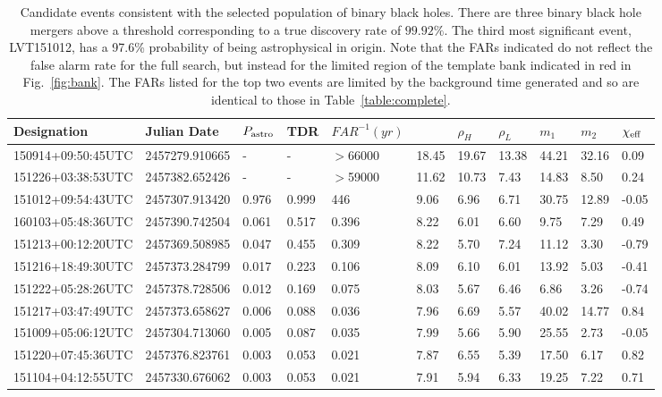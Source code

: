 \begin{table}[ht!]
  \begin{center}
    \caption{Candidate events consistent with the selected population of binary black holes. There are three binary black hole mergers above a threshold corresponding to a true discovery rate of $99.92\%$. The third most significant event, LVT151012, has a 97.6\% probability of
    being astrophysical in origin. Note that the FARs indicated do not reflect the false alarm rate for the full search, but instead for the limited region of the template bank indicated in red in Fig.~\ref{fig:bank}. The FARs listed for the top two events are limited
    by the background time generated and so are identical to those in Table~\ref{table:complete}.}
    \label{table:bbh}
  \end{center}
\begin{tabularx}{1.0\textwidth}{lllllllllll}
Designation & Julian Date & $P_{\mathrm{astro}}{}$ & TDR & $FAR^{-1} (yr)$ & \rankingstat{} & $\rho_H$ & $\rho_L$ & $m_1$ & $m_2$ & $\chi_{\mathrm{eff}}{}$ \\ \hline
150914+09:50:45UTC & 2457279.910665 & - & - &  $>$66000 & 18.45 & 19.67 & 13.38 & 44.21 & 32.16 & 0.09\\
151226+03:38:53UTC & 2457382.652426 & - & - &  $>$59000 & 11.62 & 10.73 & 7.43 & 14.83 & 8.50 & 0.24\\
151012+09:54:43UTC & 2457307.913420 & 0.976 & 0.999 &    446 & 9.06 & 6.96 & 6.71 & 30.75 & 12.89 & -0.05\\
160103+05:48:36UTC & 2457390.742504 & 0.061 & 0.517 &      0.396 & 8.22 & 6.01 & 6.60 & 9.75 & 7.29 & 0.49\\
151213+00:12:20UTC & 2457369.508985 & 0.047 & 0.455 &      0.309 & 8.22 & 5.70 & 7.24 & 11.12 & 3.30 & -0.79\\
151216+18:49:30UTC & 2457373.284799 & 0.017 & 0.223 &      0.106 & 8.09 & 6.10 & 6.01 & 13.92 & 5.03 & -0.41\\
151222+05:28:26UTC & 2457378.728506 & 0.012 & 0.169 &      0.075 & 8.03 & 5.67 & 6.46 & 6.86 & 3.26 & -0.74\\
151217+03:47:49UTC & 2457373.658627 & 0.006 & 0.088 &      0.036 & 7.96 & 6.69 & 5.57 & 40.02 & 14.77 & 0.84\\
151009+05:06:12UTC & 2457304.713060 & 0.005 & 0.087 &      0.035 & 7.99 & 5.66 & 5.90 & 25.55 & 2.73 & -0.05\\
151220+07:45:36UTC & 2457376.823761 & 0.003 & 0.053 &      0.021 & 7.87 & 6.55 & 5.39 & 17.50 & 6.17 & 0.82\\
151104+04:12:55UTC & 2457330.676062 & 0.003 & 0.053 &      0.021 & 7.91 & 5.94 & 6.33 & 19.25 & 7.22 & 0.71\\

\end{tabularx}
\end{table}
